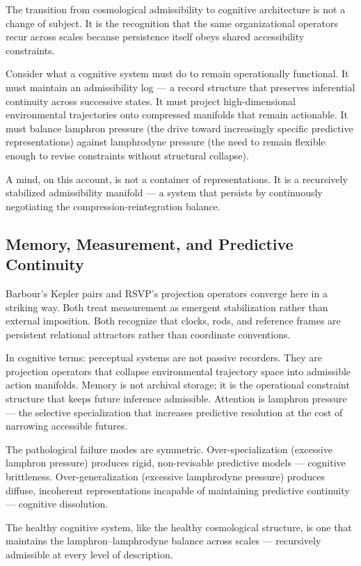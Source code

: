\documentclass[12pt, a4paper]{article}
\begin{document}
The transition from cosmological admissibility to cognitive architecture is
not a change of subject. It is the recognition that the same organizational
operators recur across scales because persistence itself obeys shared
accessibility constraints.

Consider what a cognitive system must do to remain operationally functional.
It must maintain an admissibility log — a record structure that preserves
inferential continuity across successive states. It must project
high-dimensional environmental trajectories onto compressed manifolds that
remain actionable. It must balance lamphron pressure (the drive toward
increasingly specific predictive representations) against lamphrodyne
pressure (the need to remain flexible enough to revise constraints without
structural collapse).

A mind, on this account, is not a container of representations. It is a
recursively stabilized admissibility manifold — a system that persists by
continuously negotiating the compression-reintegration balance.

\subsection{Memory, Measurement, and Predictive Continuity}

Barbour's Kepler pairs and RSVP's projection operators converge here in
a striking way. Both treat measurement as emergent stabilization rather
than external imposition. Both recognize that clocks, rods, and reference
frames are persistent relational attractors rather than coordinate
conventions.

In cognitive terms: perceptual systems are not passive recorders. They are
projection operators that collapse environmental trajectory space into
admissible action manifolds. Memory is not archival storage; it is the
operational constraint structure that keeps future inference admissible.
Attention is lamphron pressure — the selective specialization that increases
predictive resolution at the cost of narrowing accessible futures.

The pathological failure modes are symmetric. Over-specialization (excessive
lamphron pressure) produces rigid, non-revisable predictive models —
cognitive brittleness. Over-generalization (excessive lamphrodyne pressure)
produces diffuse, incoherent representations incapable of maintaining
predictive continuity — cognitive dissolution.

The healthy cognitive system, like the healthy cosmological structure, is one
that maintains the lamphron–lamphrodyne balance across scales — recursively
admissible at every level of description.
\end{document}
